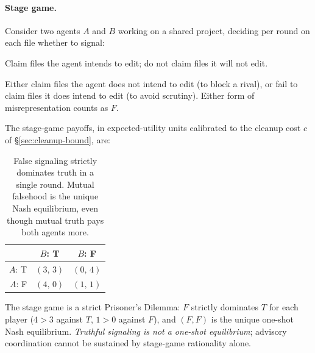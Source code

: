 \documentclass[11pt,a4paper]{article}
\theoremstyle{definition}
\theoremstyle{remark}
\begin{document}
\pagebreak
\paragraph{Stage game.}
Consider two agents $A$ and $B$ working on a shared project, deciding per round on each file whether to signal:
\begin{description}[nosep]
  \item[\textbf{T (Truthful).}] Claim files the agent intends to edit; do not claim files it will not edit.
  \item[\textbf{F (False).}] Either claim files the agent does not intend to edit (to block a rival), or fail to claim files it does intend to edit (to avoid scrutiny). Either form of misrepresentation counts as $F$.
\end{description}

The stage-game payoffs, in expected-utility units calibrated to the cleanup cost $c$ of \S\ref{sec:cleanup-bound}, are:

\begin{table}[H]
\centering
\caption{False signaling strictly dominates truth in a single round. Mutual falsehood is the unique Nash equilibrium, even though mutual truth pays both agents more.}
\label{tab:claim-stage-game}
\begin{tabular}{@{}rcc@{}}
\toprule
 & $B$: T & $B$: F \\
\midrule
$A$: T & $(3,\,3)$ & $(0,\,4)$ \\
$A$: F & $(4,\,0)$ & $(1,\,1)$ \\
\bottomrule
\end{tabular}
\end{table}

The stage game is a strict Prisoner's Dilemma: $F$ strictly dominates $T$ for each player ($4 > 3$ against $T$, $1 > 0$ against $F$), and $(F, F)$ is the unique one-shot Nash equilibrium. \emph{Truthful signaling is not a one-shot equilibrium}; advisory coordination cannot be sustained by stage-game rationality alone.
\end{document}

